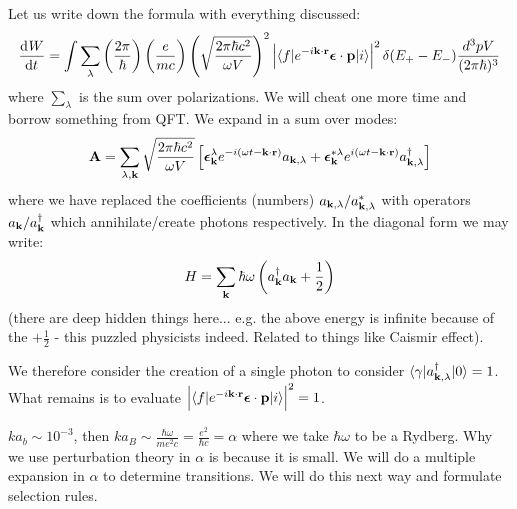 Let us write down the formula with everything discussed:
\begin{equation}
    \dod{W}{t} = \int \sum_\lambda \left(\frac{2\pi}{\hbar}\right)\left(\frac{e}{mc}\right)\left(\sqrt{\frac{2\pi\hbar c^2}{\omega V}}\right)^2 \left|\bra{f}e^{-i\v{k} \cdot \v{r}}\gv{\e} \cdot \v{p}\ket{i}\right|^2\delta(E_+ - E_-)\frac{d^3pV}{(2\pi\hbar)^3}
\end{equation}
where $\sum_\lambda$ is the sum over polarizations. We will cheat one more time and borrow something from QFT. We expand in a sum over modes:
\begin{equation}
    \mathbf{A} = \sum_{\lambda, \mathbf{k}}\sqrt{\frac{2\pi\hbar c^2}{\omega V}}\left[\mbox{\boldmath$ \epsilon $}_{\mathbf{k}}^\lambda e^{-i(\omega t - \mathbf{k} \cdot \mathbf{r})}a_{\mathbf{k}, \lambda} + \mbox{\boldmath$ \epsilon $}^{*\lambda}_{\mathbf{k}}e^{i(\omega t - \mathbf{k} \cdot \mathbf{r})}a^\dagger_{\mathbf{k}, \lambda}\right]
\end{equation}
where we have replaced the coefficients (numbers) $a_{\mathbf{k, \lambda}}/a^*_{\mathbf{k, \lambda}}$ with operators $a_{\mathbf{k}}/a^\dagger_{\mathbf{k}}$ which annihilate/create photons respectively. In the diagonal form we may write:
\begin{equation}
    H = \sum_{\mathbf{k}}\hbar\omega \left(a^\dagger_{\mathbf{k}}a_{\mathbf{k}} + \frac{1}{2}\right)
\end{equation}
(there are deep hidden things here... e.g. the above energy is infinite because of the $+\frac{1}{2}$ - this puzzled physicists indeed. Related to things like Caismir effect).

We therefore consider the creation of a single photon to consider $\langle \gamma \rvert a^\dagger_{\mathbf{k}, \lambda}\lvert 0 \rangle = 1$. What remains is to evaluate $\left|\langle f \rvert e^{-i\mathbf{k} \cdot \mathbf{r}}\mbox{\boldmath$ \epsilon $} \cdot \mathbf{p}\lvert i \rangle\right|^2 = 1$. 

$ka_b \sim 10^{-3}$, then $ka_B \sim \frac{\hbar\omega}{me^2c} = \frac{e^2}{\hbar c} = \alpha$ where we take $\hbar\omega$ to be a Rydberg. Why we use perturbation theory in $\alpha$ is because it is small. We will do a multiple expansion in $\alpha$ to determine transitions. We will do this next way and formulate selection rules.